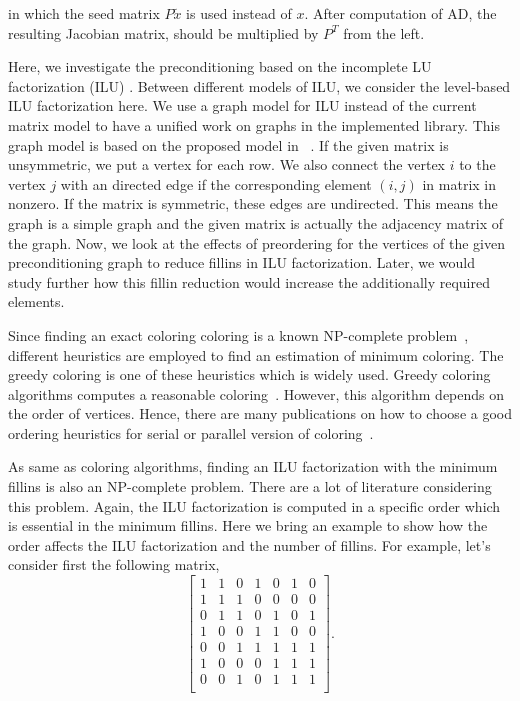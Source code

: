 \documentclass[12pt, oneside]{book}
\begin{document}
in which the seed matrix $P \tilde{x}$ is used instead of $x$.
After computation of AD, the resulting Jacobian matrix, should be multiplied
by $P^T$ from the left.
 

Here, we investigate the preconditioning based on the incomplete LU factorization (ILU) \cite{ilu2003}.
Between different models of ILU, we consider the level-based ILU factorization here.
We use a graph model for ILU instead of the current matrix model to have a unified
work on graphs in the implemented library. This graph model is based on the proposed
model in ~\cite{precond-pothen}. If the given matrix is unsymmetric,
we put a vertex for each row. We also connect the vertex $i$ to the
vertex $j$ with an directed edge if the corresponding element $(i,j)$ in matrix
in nonzero. If the matrix is symmetric, these edges are undirected. This means
 the graph is a simple graph and the given matrix is actually the adjacency
matrix of the graph.
Now, we look at the effects of preordering for the vertices of the given preconditioning graph to reduce fillins in ILU factorization. Later, we would study further how this fillin reduction would increase the additionally required elements.

Since finding an exact coloring coloring is a known NP-complete problem~\cite{SPINRAD198589},
different heuristics are employed to find an estimation of minimum coloring. The greedy
coloring is one of these heuristics which is widely used. 
Greedy coloring algorithms computes a reasonable coloring~\cite{spaa14}.
However, this algorithm depends on the order of vertices. 
Hence, there are many publications on how to choose a good ordering heuristics
for serial or parallel version of coloring~\cite{ordering1,ordering2,ordering3}.

As same as coloring algorithms, finding an ILU factorization with the minimum
fillins is also an NP-complete problem. There are a lot of literature 
considering this problem\cite{ilu_ordering1,ilu_ordering2,ilu_ordering3,ilu_ordering4}. 
Again, the ILU factorization is computed in a specific order which is essential
in the minimum fillins. Here we bring an example to show how the order affects 
the ILU factorization and the number of fillins. 
For example, let's consider first the following matrix,
$$\begin{bmatrix}
 1 & 1 & 0 & 1 & 0 & 1 & 0\\
 1 & 1 & 1 & 0 & 0 & 0 & 0\\
 0 & 1 & 1 & 0 & 1 & 0 & 1\\
 1 & 0 & 0 & 1 & 1 & 0 & 0\\
 0 & 0 & 1 & 1 & 1 & 1 & 1\\
 1 & 0 & 0 & 0 & 1 & 1 & 1\\
 0 & 0 & 1 & 0 & 1 & 1 & 1\\
 \end{bmatrix}.$$
\end{document}
